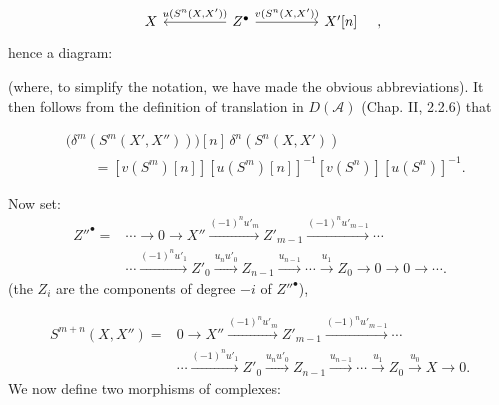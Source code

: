 \clearpage
{}%
\begingroup\small\setlength{\parskip}{0pt}\setlength{\emergencystretch}{1.5em}
\setlength{\abovedisplayskip}{4pt plus 2pt minus 2pt}%
\setlength{\belowdisplayskip}{4pt plus 2pt minus 2pt}%

\[
\begin{tikzcd}[column sep=4.5em]
X & Z^\bullet
  \arrow[l,"{u(S^n(X,X'))}"']
  \arrow[r,"{v(S^n(X,X'))}"]
& X'[n]
\end{tikzcd}
\quad,
\]
hence a diagram:

\begin{center}
\end{center}
(where, to simplify the notation, we have made the obvious abbreviations).
It then follows from the definition of translation in $D(\mathcal A)$
(Chap. II, 2.2.6) that

\begin{equation}
\begin{aligned}
&\bigl(\delta^m(S^m(X',X''))\bigr)[n]\,
  \delta^n(S^n(X,X'))\\
&\qquad={}
[v(S^m)[n]][u(S^m)[n]]^{-1}[v(S^n)][u(S^n)]^{-1}.
\end{aligned}
\tag{3.2.5.1}
\end{equation}

Now set:
\begin{equation}
\begin{aligned}
Z''^\bullet={}&\cdots\longrightarrow0\longrightarrow X''
\xrightarrow{(-1)^n u'_m}Z'_{m-1}
\xrightarrow{(-1)^n u'_{m-1}}\cdots\\
&\cdots\xrightarrow{(-1)^n u'_1}Z'_0
\xrightarrow{u_nu'_0}Z_{n-1}
\xrightarrow{u_{n-1}}\cdots\xrightarrow{u_1}Z_0
\longrightarrow0\longrightarrow0\longrightarrow\cdots.
\end{aligned}
\tag{3.2.5.2}
\end{equation}
(the $Z_i$ are the components of degree $-i$ of $Z''^\bullet$),

\[
\begin{aligned}
S^{m+n}(X,X'')={}&0\longrightarrow X''
\xrightarrow{(-1)^n u'_m}Z'_{m-1}
\xrightarrow{(-1)^n u'_{m-1}}\cdots\\
&\cdots\xrightarrow{(-1)^n u'_1}Z'_0
\xrightarrow{u_nu'_0}Z_{n-1}
\xrightarrow{u_{n-1}}\cdots\xrightarrow{u_1}Z_0
\xrightarrow{u_0}X\longrightarrow0.
\end{aligned}
\]
We now define two morphisms of complexes:

